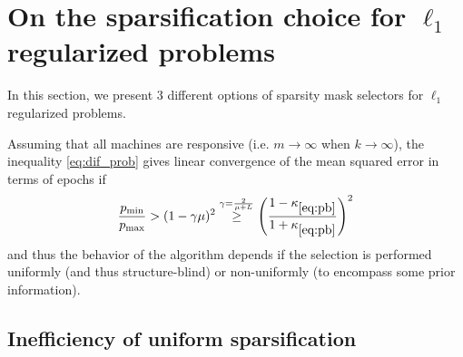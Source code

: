 \section{On the sparsification choice for $\ell_1$ regularized problems}\label{sec:distributed-adaptive}

In this section, we present $3$ different options of sparsity mask selectors for $\ell_1$ regularized problems.

Assuming that all machines are responsive (i.e. $m\to \infty$ when $k\to\infty$), the inequality \eqref{eq:dif_prob} gives linear convergence of the mean squared error in terms of epochs if
\begin{equation}\label{eq:prob_gap}
    \frac{p_{\min}}{p_{\max}} > (1-\gamma \mu)^2 \stackrel{\gamma = \frac{2}{\mu + L}}{\geq} \left(\frac{1-\kappa_{\eqref{eq:pb}}}{1+\kappa_{\eqref{eq:pb}}}\right)^2
\end{equation}
and thus the behavior of the algorithm depends if the selection is performed uniformly (and thus structure-blind) or non-uniformly (to encompass some prior information).

\subsection{Inefficiency of uniform sparsification}

